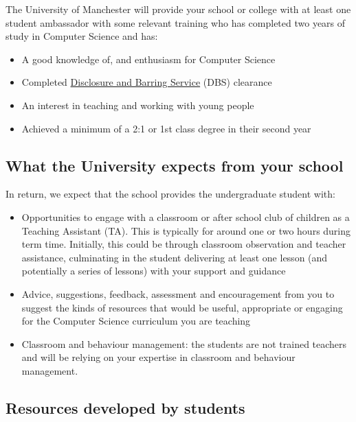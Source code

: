 \documentclass[
  12pt,
]{book}
\providecommand{\tightlist}{%
  \setlength{\itemsep}{0pt}\setlength{\parskip}{0pt}}
\begin{document}
The University of Manchester will provide your school or college with at least one student ambassador with some relevant training who has completed two years of study in Computer Science and has:

\begin{itemize}
\tightlist
\item
  A good knowledge of, and enthusiasm for Computer Science
\item
  Completed \href{https://www.gov.uk/government/organisations/disclosure-and-barring-service}{Disclosure and Barring Service} (DBS) clearance
\item
  An interest in teaching and working with young people
\item
  Achieved a minimum of a 2:1 or 1st class degree in their second year
\end{itemize}

\hypertarget{what-the-university-expects-from-your-school}{%
\subsection{What the University expects from your school}\label{what-the-university-expects-from-your-school}}

In return, we expect that the school provides the undergraduate student with:

\begin{itemize}
\tightlist
\item
  Opportunities to engage with a classroom or after school club of children as a Teaching Assistant (TA). This is typically for around one or two hours during term time. Initially, this could be through classroom observation and teacher assistance, culminating in the student delivering at least one lesson (and potentially a series of lessons) with your support and guidance
\item
  Advice, suggestions, feedback, assessment and encouragement from you to suggest the kinds of resources that would be useful, appropriate or engaging for the Computer Science curriculum you are teaching
\item
  Classroom and behaviour management: the students are not trained teachers and will be relying on your expertise in classroom and behaviour management.
\end{itemize}

\hypertarget{resources-developed-by-students}{%
\subsection{Resources developed by students}\label{resources-developed-by-students}}
\end{document}
